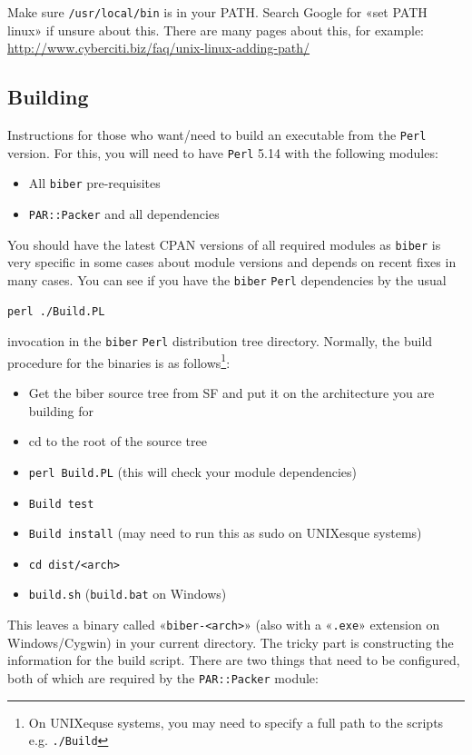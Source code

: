 \documentclass{ltxdockit}
\begin{document}
\noindent Make sure \verb+/usr/local/bin+ is in your PATH. Search Google for «set PATH
linux» if unsure about this. There are many pages about this, for example:
\url{http://www.cyberciti.biz/faq/unix-linux-adding-path/}


\subsection{Building}

Instructions for those who want/need to build an executable from the
\verb+Perl+ version. For this, you will need to have \verb+Perl+ 5.14 with
the following modules:

\begin{itemize}
\item All \verb+biber+ pre-requisites
\item \verb+PAR::Packer+ and all dependencies
\end{itemize}

\noindent You should have the latest CPAN versions of all required modules
as \verb+biber+ is very specific in some cases about module versions and
depends on recent fixes in many cases. You can see if you have the
\verb+biber+ \verb+Perl+ dependencies by the usual

\begin{verbatim}
perl ./Build.PL
\end{verbatim}

\noindent invocation in the \verb+biber+ \verb+Perl+ distribution tree
directory. Normally, the build procedure for the binaries is as
follows\footnote{On UNIXequse systems, you may need to specify a full
  path to the scripts e.g. \texttt{./Build}}:

\begin{itemize}
\item Get the biber source tree from SF and put it on the architecture
  you are building for
\item cd to the root of the source tree
\item \verb+perl Build.PL+ (this will check your module
  dependencies)
\item \verb+Build test+
\item \verb+Build install+ (may need to run this as sudo on
  UNIXesque systems)
\item \verb+cd dist/<arch>+
\item \verb+build.sh+ (\verb+build.bat+ on Windows)
\end{itemize}

\noindent This leaves a binary called «\verb+biber-<arch>+» (also with
a «\verb+.exe+» extension on Windows/Cygwin) in your current directory.
The tricky part is constructing the information for the build
script. There are two things that need to be configured, both of
which are required by the \verb+PAR::Packer+ module:
\end{document}
